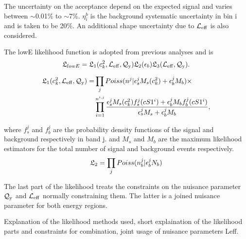 The uncertainty on the acceptance depend on the expected signal and varies between $\sim$0.01\% to $\sim$7\%. $\eta^{b}_{i}$ is the background systematic uncertainty in bin i and is taken to be 20\%. An additional shape uncertainty due to $\mathcal{L}_{\mathrm{eff}}$ is also considered.   

The lowE likelihood function is adopted from previous analyses and is \begin{equation}
\label{eq:LowELikelihood}
\mathfrak{L}_{lowE} = \mathfrak{L}_1(c_k^2,\mathcal{L}_{\mathrm{eff}},\mathcal{Q}_{\mathrm{y}}) \mathfrak{L}_2(\epsilon_b) \mathfrak{L}_3(\mathcal{L}_{\mathrm{eff}},\mathcal{Q}_{\mathrm{y}}) .
\end{equation}

\begin{equation} \label{eq:LowELikelihood1}
\begin{split}
\mathfrak{L}_1(c_k^2,\mathcal{L}_{\mathrm{eff}},\mathcal{Q}_{\mathrm{y}}) = &\prod_j Poiss(n^j|\epsilon_s^jM_s(c_k^2)+\epsilon_b^jM_b) \times  \\
&\prod_{i=1}^{n^{i,j}} \frac{\epsilon_s^j M_s(c_k^2)f_s^j(cS1^i) + \epsilon_b^j M_bf_b^j(cS1^i)}{\epsilon^j_sM_s + \epsilon^j_bM_b} ,
\end{split}
\end{equation}

where $f^j_s$ and $f^j_b$ are the probability density functions of the signal and background respectively in band j. and $M_s$ and $M_b$ are the maximum likelihood estimators for the total number of signal and background events respectively.
\begin{equation}
\mathfrak{L}_2 = \prod_j Poiss(n^j_b | \epsilon_b^jN_b)
\end{equation} 

The last part of the likelihood treats the constraints on the nuisance parameter $\mathcal{Q}_{\mathrm{y}}$ and $\mathcal{L}_{\mathrm{eff}}$ normally constraining them. The latter is a joined nuisance parameter for both energy regions. 


Explanation of the likelihood methods used, short explaination of the likelihood parts and constraints for combination, joint usage of nuisance parameters {Leff}.





